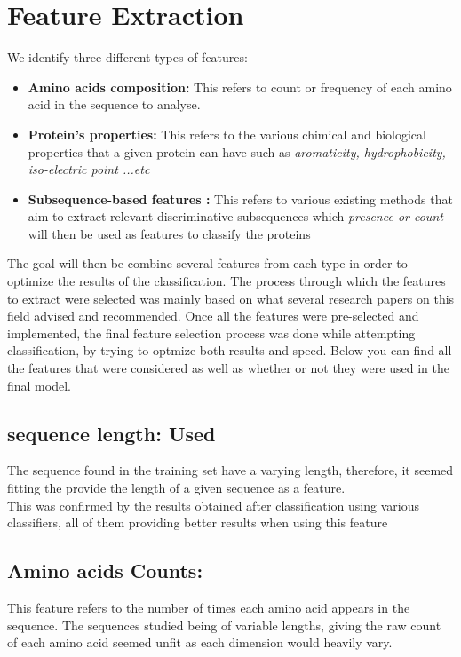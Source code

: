 \documentclass{bioinfo}
\begin{document}
\section{Feature Extraction}

We identify three different types of features:
\begin{itemize}
 	\item \textbf{Amino acids composition: } This refers to count or frequency of each amino acid in the sequence to analyse. 
	\item \textbf{Protein's properties: } This refers to the various chimical and biological properties that a given protein can have such as \textit{aromaticity, hydrophobicity, iso-electric point ...etc}
	\item \textbf{Subsequence-based features : } This refers to various existing methods that aim to extract relevant discriminative subsequences which \textit{presence or count} will then be used as features to classify the proteins
\end{itemize}

The goal will then be combine several features from each type in order to optimize the results of the classification. The process through which the features to extract were selected was mainly based on what several research papers on this field advised and recommended. Once all the features were pre-selected and implemented, the final feature selection process was done while attempting classification, by trying to optmize both results and speed. Below you can find all the features that were considered as well as whether or not they were used in the final model. 

\subsection{sequence length: \textbf{Used}}
The sequence found in the training set have a varying length, therefore, it seemed fitting the provide the length of a given sequence as a feature. \\
This was confirmed by the results obtained after classification using various classifiers, all of them providing better results when using this feature 

\subsection{Amino acids Counts: }
This feature refers to the number of times each amino acid appears in the sequence.
The sequences studied being of variable lengths, giving the raw count of each amino acid seemed unfit as each dimension would heavily vary.
\end{document}
